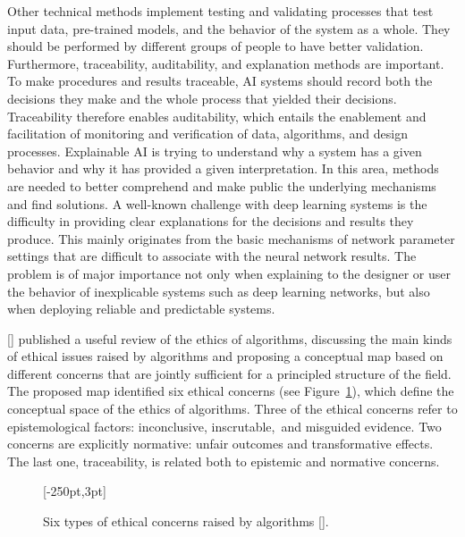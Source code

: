 Other technical methods implement testing and validating processes that test input data, pre-trained models, and the behavior of the system as a whole. They should be performed by different groups of people to have better validation. Furthermore, traceability, auditability, and explanation methods are important. To make procedures and results traceable, AI systems should record both the decisions they make and the whole process that yielded their decisions. Traceability therefore enables auditability, which entails the enablement and facilitation of monitoring and verification of data, algorithms, and design processes. Explainable AI is trying to understand why a system has a given behavior and why it has provided a given interpretation. In this area, methods are needed to better comprehend and make public the underlying mechanisms and find solutions. A well-known challenge with deep learning systems is the difficulty in providing clear explanations for the decisions and results they produce. This mainly originates from the basic mechanisms of network parameter settings that are difficult to \hbox{associate} with the neural network results. The problem is of major importance not only when explaining to the designer or user the behavior of inexplicable systems such as deep learning networks, but also when deploying reliable and predictable systems.

\citeauthor{chap:7:Mittelstadtetal:2016} [\mbox{\citeyear{chap:7:Mittelstadtetal:2016}}] published a useful review of the ethics of algorithms, discussing the main kinds of ethical issues raised by algorithms and proposing a conceptual map based on different concerns that are jointly sufficient for a principled structure of the field. The proposed map identified six ethical concerns (see Figure~\ref{fig:7.1}), which define the conceptual space of the ethics of algorithms. Three of the ethical concerns refer to epistemological factors: inconclusive, \hbox{inscrutable, and} misguided evidence. Two concerns are explicitly normative: unfair outcomes and transformative effects. The last one, traceability, is related both to epistemic and normative concerns.


\begin{figure}[t!]
[-250pt,3pt]
\caption{\label{fig:7.1}Six types of ethical concerns raised by algorithms [\citealt{chap:7:Mittelstadtetal:2016}].}
\end{figure}

